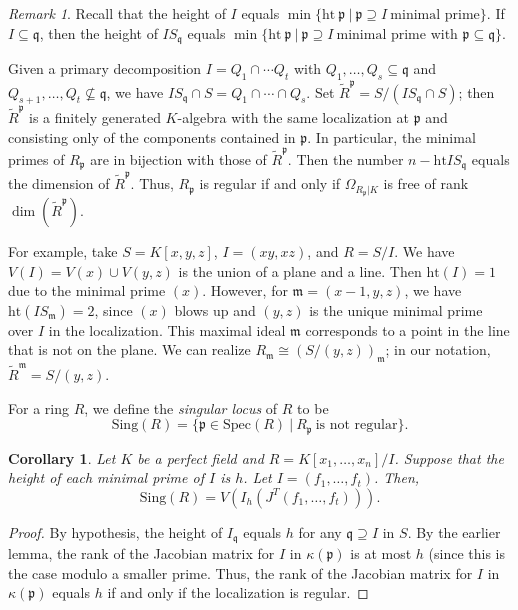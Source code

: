 \documentclass{amsart}[12pt]
\newcommand{\htt}{\mathrm{ht}}
\newcommand{\Spec}{\mathrm{Spec}}
\newcommand{\fp}{{\mathfrak p}}
\newcommand{\fm}{{\mathfrak m}}
\newcommand{\fq}{{\mathfrak q}}
\numberwithin{equation}{section}
\theoremstyle{plain} %
\newtheorem{cor}[equation]{Corollary}
\theoremstyle{definition}
\theoremstyle{remark}
\newtheorem{rem}[equation]{Remark}
\begin{document}
\begin{rem}
Recall that the height of $I$ equals $\min\{ \htt \ \fp \ | \ \fp \supseteq I \ \text{minimal prime}\}$. If $I\subseteq \fq$, then the height of $I S_\fq$ equals $\min\{ \htt \ \fp \ | \ \fp \supseteq I \ \text{minimal prime with } \fp \subseteq \fq\}$.

Given a primary decomposition $I= Q_1 \cap \cdots Q_t$ with $Q_1, \dots, Q_s \subseteq \fq$ and $Q_{s+1} ,\dots ,Q_t \not \subseteq \fq$, we have $I S_\fq \cap S = Q_1 \cap \cdots \cap Q_s$. Set $\widetilde{R}^{\fp} = S/ (I S_\fq \cap S)$; then $\widetilde{R}^{\fp}$ is a finitely generated $K$-algebra with the same localization at $\fp$ and consisting only of the components contained in $\fp$. In particular, the minimal primes of $R_\fp$ are in bijection with those of $\widetilde{R}^{\fp}$. Then the number $n-\htt I S_\fq$ equals the dimension of $\widetilde{R}^{\fp}$. Thus, $R_\fp$ is regular if and only if $\Omega_{R_\fp|K}$ is free of rank $\dim(\widetilde{R}^{\fp})$.

For example, take $S=K[x,y,z]$, $I=(xy,xz)$, and $R=S/I$. We have $V(I) = V(x) \cup V(y,z)$ is the union of a plane and a line. Then $\htt(I)=1$ due to the minimal prime $(x)$. However, for $\fm=(x-1,y,z)$, we have $\htt(I S_\fm) = 2$, since $(x)$ blows up and $(y,z)$ is the unique minimal prime over $I$ in the localization. This maximal ideal $\fm$ corresponds to a point in the line that is not on the plane. We can realize $R_\fm \cong (S/(y,z))_\fm$; in our notation, $\widetilde{R}^{\fm} = S/(y,z)$.
\end{rem}

For a ring $R$, we define the \emph{singular locus} of $R$ to be
\[ \mathrm{Sing}(R) = \{ \fp\in \Spec(R) \ | \ R_{\fp} \ \text{is not regular}\} .\]

\begin{cor} Let $K$ be a perfect field and $R=K[x_1,\dots,x_n]/I$. Suppose that the height of each minimal prime of $I$ is $h$. Let $I=(f_1,\dots,f_t)$. Then, 
\[ \mathrm{Sing}(R) = V( I_h( J^T(f_1,\dots,f_t))).\]
\end{cor}
\begin{proof}
By hypothesis, the height of $I_\fq$ equals $h$ for any $\fq \supseteq I$ in $S$.
By the earlier lemma, the rank of the Jacobian matrix for $I$ in $\kappa(\fp)$ is at most $h$ (since this is the case modulo a smaller prime. Thus, the rank of the Jacobian matrix for $I$ in $\kappa(\fp)$ equals $h$ if and only if the localization is regular. 
\end{proof}
\end{document}

